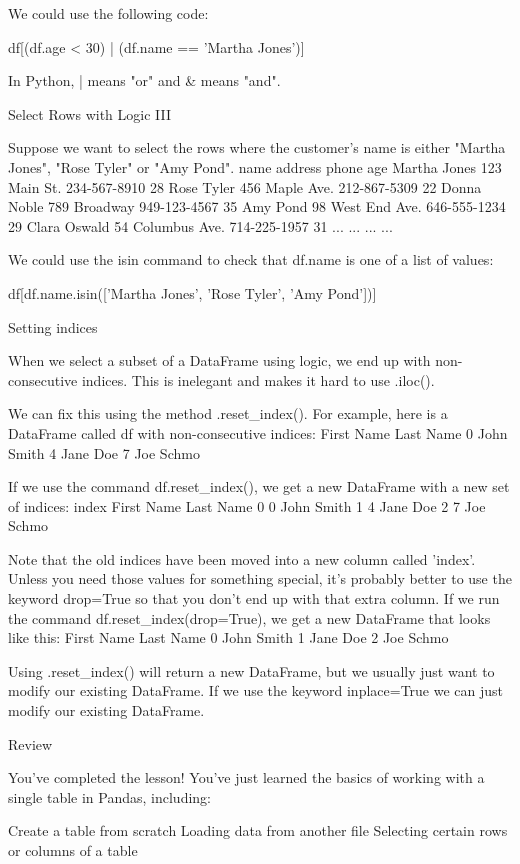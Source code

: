 \documentclass{journal}
\begin{document}
We could use the following code:

df[(df.age < 30) |
   (df.name == 'Martha Jones')]

In Python, | means "or" and & means "and".


Select Rows with Logic III

Suppose we want to select the rows where the customer's name is either "Martha Jones", "Rose Tyler" or "Amy Pond".
name 	address 	phone 	age
Martha Jones 	123 Main St. 	234-567-8910 	28
Rose Tyler 	456 Maple Ave. 	212-867-5309 	22
Donna Noble 	789 Broadway 	949-123-4567 	35
Amy Pond 	98 West End Ave. 	646-555-1234 	29
Clara Oswald 	54 Columbus Ave. 	714-225-1957 	31
... 	... 	... 	...

We could use the isin command to check that df.name is one of a list of values:

df[df.name.isin(['Martha Jones',
     'Rose Tyler',
     'Amy Pond'])]

Setting indices

When we select a subset of a DataFrame using logic, we end up with non-consecutive indices. This is inelegant and makes it hard to use .iloc().

We can fix this using the method .reset_index(). For example, here is a DataFrame called df with non-consecutive indices:
	First Name 	Last Name
0 	John 	Smith
4 	Jane 	Doe
7 	Joe 	Schmo

If we use the command df.reset_index(), we get a new DataFrame with a new set of indices:
	index 	First Name 	Last Name
0 	0 	John 	Smith
1 	4 	Jane 	Doe
2 	7 	Joe 	Schmo

Note that the old indices have been moved into a new column called 'index'. Unless you need those values for something special, it's probably better to use the keyword drop=True so that you don't end up with that extra column. If we run the command df.reset_index(drop=True), we get a new DataFrame that looks like this:
	First Name 	Last Name
0 	John 	Smith
1 	Jane 	Doe
2 	Joe 	Schmo

Using .reset_index() will return a new DataFrame, but we usually just want to modify our existing DataFrame. If we use the keyword inplace=True we can just modify our existing DataFrame.


Review

You've completed the lesson! You've just learned the basics of working with a single table in Pandas, including:

    Create a table from scratch
    Loading data from another file
    Selecting certain rows or columns of a table
\end{document}
